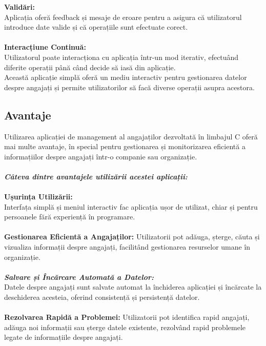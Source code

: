 \documentclass[12pt,a4paper]{article}
\begin{document}
\textbf{Validări:\\}
Aplicația oferă feedback și mesaje de eroare pentru a asigura că utilizatorul introduce date valide și că operațiile sunt efectuate corect.\\\\
\textbf{Interacțiune Continuă:\\}
Utilizatorul poate interacționa cu aplicația într-un mod iterativ, efectuând diferite operații până când decide să iasă din aplicație.\\
Această aplicație simplă oferă un mediu interactiv pentru gestionarea datelor despre angajați și permite utilizatorilor să facă diverse operații asupra acestora.

\newpage

\subsection{Avantaje}
Utilizarea aplicației de management al angajaților dezvoltată în limbajul C oferă mai multe avantaje, în special pentru gestionarea și monitorizarea eficientă a informațiilor despre angajați într-o companie sau organizație. \\\\
\textbf{\textit{Câteva dintre avantajele utilizării acestei aplicații:\\\\}}
\textbf{Ușurința Utilizării:\\}
Interfața simplă și meniul interactiv fac aplicația ușor de utilizat, chiar și pentru persoanele fără experiență în programare.\\\\
\textbf{Gestionarea Eficientă a Angajaților:}
Utilizatorii pot adăuga, șterge, căuta și vizualiza informații despre angajați, facilitând gestionarea resurselor umane în organizație.\\\\
\textbf{\textit{Salvare și Încărcare Automată a Datelor:\\}}
Datele despre angajați sunt salvate automat la închiderea aplicației și încărcate la deschiderea acesteia, oferind consistență și persistență datelor.\\\\
\textbf{Rezolvarea Rapidă a Problemei:}
Utilizatorii pot identifica rapid angajați, adăuga noi informații sau șterge datele existente, rezolvând rapid problemele legate de informațiile despre angajați.\\\\
\end{document}
